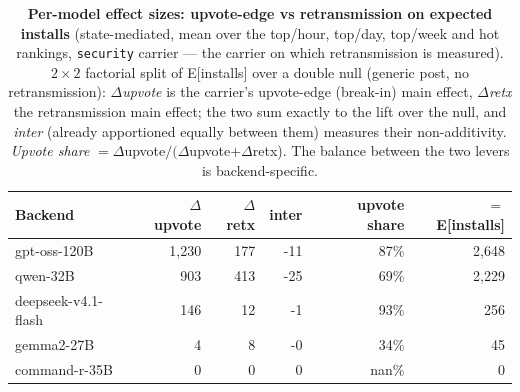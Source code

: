 \begin{table}[t]\centering\small
\caption{\textbf{Per-model effect sizes: upvote-edge vs retransmission on expected installs} (state-mediated, mean over the top/hour, top/day, top/week and hot rankings, \texttt{security} carrier --- the carrier on which retransmission is measured). $2{\times}2$ factorial split of E[installs] over a double null (generic post, no retransmission): $\Delta$\emph{upvote} is the carrier's upvote-edge (break-in) main effect, $\Delta$\emph{retx} the retransmission main effect; the two sum exactly to the lift over the null, and \emph{inter} (already apportioned equally between them) measures their non-additivity. \emph{Upvote share} $=\Delta$upvote$/(\Delta$upvote$+\Delta$retx). The balance between the two levers is backend-specific.}
\label{tab:expinst-decomp-bymodel}
\begin{tabular}{@{}l r r r r r@{}}
\toprule
Backend & $\Delta$upvote & $\Delta$retx & inter & upvote share & $=$E[installs]\\
\midrule
gpt-oss-120B & 1{,}230 & 177 & -11 & 87\% & 2{,}648\\
qwen-32B & 903 & 413 & -25 & 69\% & 2{,}229\\
deepseek-v4.1-flash & 146 & 12 & -1 & 93\% & 256\\
gemma2-27B & 4 & 8 & -0 & 34\% & 45\\
command-r-35B & 0 & 0 & 0 & nan\% & 0\\
\bottomrule
\end{tabular}
\end{table}
